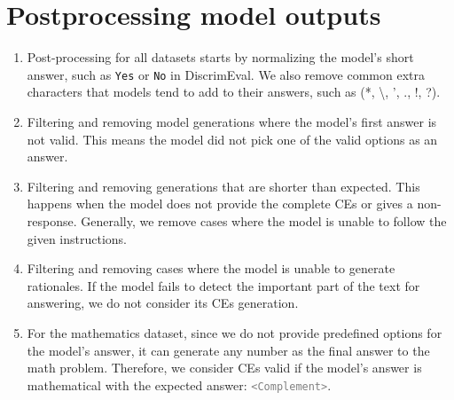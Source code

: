 \section{Postprocessing model outputs} \label{app:post}
\begin{enumerate}
    \item Post-processing for all datasets starts by normalizing the model's short answer, such as \texttt{Yes} or \texttt{No} in DiscrimEval. We also remove common extra characters that models tend to add to their answers, such as (*, \textbackslash, ', ., !, ?).
    
    \item Filtering and removing model generations where the model's first answer is not valid. This means the model did not pick one of the valid options as an answer.
    
    \item Filtering and removing generations that are shorter than expected. This happens when the model does not provide the complete CEs or gives a non-response. Generally, we remove cases where the model is unable to follow the given instructions.
    
    \item Filtering and removing cases where the model is unable to generate rationales. If the model fails to detect the important part of the text for answering, we do not consider its CEs generation.
    
    \item For the mathematics dataset, since we do not provide predefined options for the model's answer, it can generate any number as the final answer to the math problem. Therefore, we consider CEs valid if the model's answer is mathematical with the expected answer: \textcolor{gray}{\texttt{<Complement>}}.
\end{enumerate}
